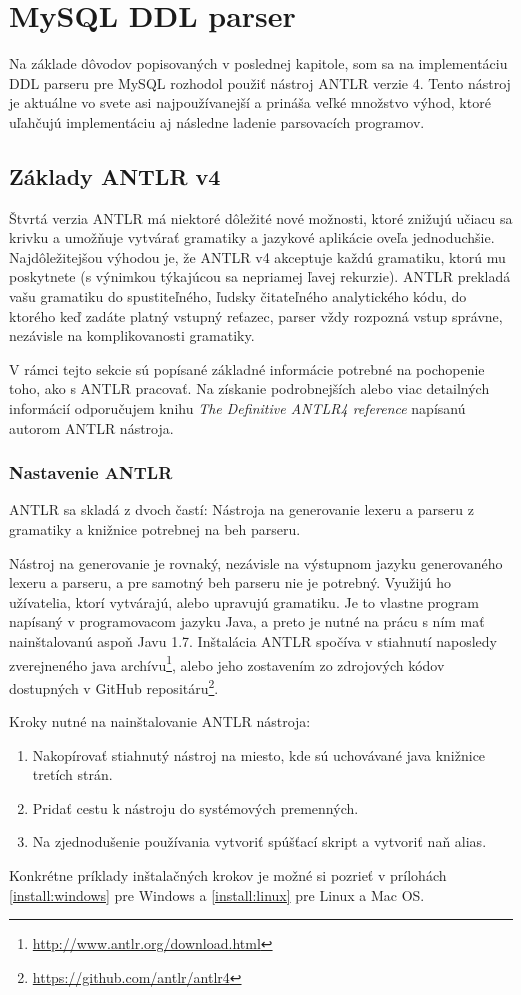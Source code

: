 \chapter{MySQL DDL parser}
Na základe dôvodov popisovaných v poslednej kapitole, som sa na implementáciu DDL parseru pre MySQL rozhodol použiť nástroj ANTLR verzie 4. Tento nástroj je aktuálne vo svete asi najpoužívanejší a prináša veľké množstvo výhod, ktoré uľahčujú implementáciu aj následne ladenie parsovacích programov.

\section{Základy ANTLR v4}

Štvrtá verzia ANTLR má niektoré dôležité nové možnosti, ktoré znižujú učiacu sa krivku a umožňuje vytvárať gramatiky a jazykové aplikácie oveľa jednoduchšie. Najdôležitejšou výhodou je, že ANTLR v4 akceptuje každú gramatiku, ktorú mu poskytnete (s výnimkou týkajúcou sa nepriamej ľavej rekurzie). ANTLR prekladá vašu gramatiku do spustiteľného, ľudsky čitateľného analytického kódu, do ktorého keď zadáte platný vstupný reťazec, parser vždy rozpozná vstup správne, nezávisle na komplikovanosti gramatiky.

V rámci tejto sekcie sú popísané základné informácie potrebné na pochopenie toho, ako s ANTLR pracovať. Na získanie podrobnejších alebo viac detailných informácií odporučujem knihu \textit{The Definitive ANTLR4 reference}\cite{definitiveANTLR} napísanú autorom ANTLR nástroja.

\subsection{Nastavenie ANTLR}
ANTLR sa skladá z dvoch častí: Nástroja na generovanie lexeru a parseru z gramatiky a knižnice potrebnej na beh parseru.

Nástroj na generovanie je rovnaký, nezávisle na výstupnom jazyku generovaného lexeru a parseru, a pre samotný beh parseru nie je potrebný. Využijú ho užívatelia, ktorí vytvárajú, alebo upravujú gramatiku. Je to vlastne program napísaný v programovacom jazyku Java, a preto je nutné na prácu s ním mať nainštalovanú aspoň Javu 1.7. Inštalácia ANTLR spočíva v stiahnutí naposledy zverejneného java archívu\footnote{\url{http://www.antlr.org/download.html}}, alebo jeho zostavením zo zdrojových kódov dostupných v GitHub repositáru\footnote{\url{https://github.com/antlr/antlr4}}. 

Kroky nutné na nainštalovanie ANTLR nástroja:
\begin{enumerate}
\item Nakopírovať stiahnutý nástroj na miesto, kde sú uchovávané java knižnice tretích strán.
\item Pridať cestu k nástroju do systémových premenných.
\item Na zjednodušenie používania vytvoriť spúšťací skript a vytvoriť naň alias.
\end{enumerate}
Konkrétne príklady inštalačných krokov je možné si pozrieť v prílohách \ref{install:windows} pre Windows a \ref{install:linux} pre Linux a Mac OS.

